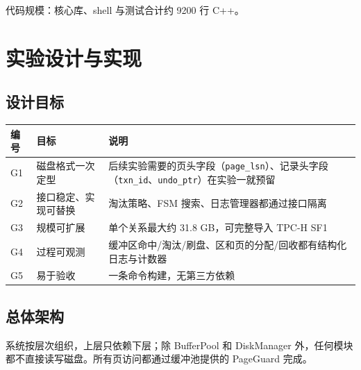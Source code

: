 \documentclass[11pt,a4paper]{ctexart}
\newcommand{\code}[1]{\texttt{#1}}
\begin{document}
代码规模：核心库、shell 与测试合计约 9200 行 C++。

\section{实验设计与实现}

\subsection{设计目标}

\begin{table}[H]
  \centering
  \begin{tabularx}{\textwidth}{l l X}
    \toprule
    编号 & 目标 & 说明 \\
    \midrule
    G1 & 磁盘格式一次定型 & 后续实验需要的页头字段（\code{page\_lsn}）、记录头字段（\code{txn\_id}、\code{undo\_ptr}）在实验一就预留 \\
    G2 & 接口稳定、实现可替换 & 淘汰策略、FSM 搜索、日志管理器都通过接口隔离 \\
    G3 & 规模可扩展 & 单个关系最大约 31.8 GB，可完整导入 TPC-H SF1 \\
    G4 & 过程可观测 & 缓冲区命中/淘汰/刷盘、区和页的分配/回收都有结构化日志与计数器 \\
    G5 & 易于验收 & 一条命令构建，无第三方依赖 \\
    \bottomrule
  \end{tabularx}
\end{table}

\subsection{总体架构}

系统按层次组织，上层只依赖下层；除 BufferPool 和 DiskManager 外，任何模块都不直接读写磁盘。所有页访问都通过缓冲池提供的 PageGuard 完成。
\end{document}
